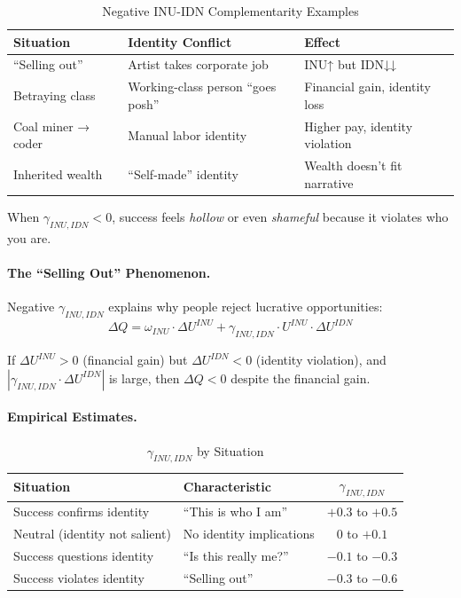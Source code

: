 \begin{table}[htbp]
\centering
\caption{Negative INU-IDN Complementarity Examples}
\label{tab:inu-idn-negative}
\renewcommand{\arraystretch}{1.3}
\begin{tabular}{@{}lll@{}}
\toprule
\textbf{Situation} & \textbf{Identity Conflict} & \textbf{Effect} \\
\midrule
``Selling out'' & Artist takes corporate job & INU↑ but IDN↓↓ \\
Betraying class & Working-class person ``goes posh'' & Financial gain, identity loss \\
Coal miner → coder & Manual labor identity & Higher pay, identity violation \\
Inherited wealth & ``Self-made'' identity & Wealth doesn't fit narrative \\
\bottomrule
\end{tabular}
\end{table}

When $\gamma_{INU,IDN} < 0$, success feels \emph{hollow} or even \emph{shameful}
because it violates who you are.

\paragraph{The ``Selling Out'' Phenomenon.}
Negative $\gamma_{INU,IDN}$ explains why people reject lucrative opportunities:
\begin{equation}
\Delta Q = \omega_{INU} \cdot \Delta U^{INU} + \gamma_{INU,IDN} \cdot U^{INU} \cdot \Delta U^{IDN}
\end{equation}

If $\Delta U^{INU} > 0$ (financial gain) but $\Delta U^{IDN} < 0$ (identity violation),
and $|\gamma_{INU,IDN} \cdot \Delta U^{IDN}|$ is large, then $\Delta Q < 0$ despite 
the financial gain.

\paragraph{Empirical Estimates.}

\begin{table}[htbp]
\centering
\caption{$\gamma_{INU,IDN}$ by Situation}
\label{tab:gamma-inu-idn-context}
\renewcommand{\arraystretch}{1.3}
\begin{tabular}{@{}llc@{}}
\toprule
\textbf{Situation} & \textbf{Characteristic} & $\gamma_{INU,IDN}$ \\
\midrule
Success confirms identity & ``This is who I am'' & $+0.3$ to $+0.5$ \\
Neutral (identity not salient) & No identity implications & $0$ to $+0.1$ \\
Success questions identity & ``Is this really me?'' & $-0.1$ to $-0.3$ \\
Success violates identity & ``Selling out'' & $-0.3$ to $-0.6$ \\
\bottomrule
\end{tabular}
\end{table}

